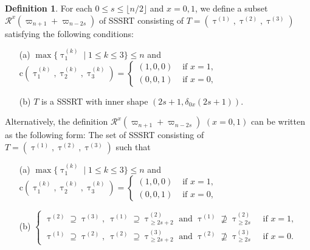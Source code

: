 \documentclass[11pt, leqno]{amsart}
\theoremstyle{plain}
\theoremstyle{definition}
\newtheorem{definition}[theorem]{Definition}
\numberwithin{equation}{section}
\newcommand{\fw}{\varpi} %
\newcommand{\ntau}[1]{\btau^{(#1)}}
\newcommand{\clr}{\mathrm{c}}
\newcommand{\btau}{\uptau}
\begin{document}
\begin{definition}
For each $0 \le s \le \lfloor n/2 \rfloor$ and $x=0,1$, we define a subset $\mathscr{R}^x(\fw_{n+1}+\fw_{n-2s})$ of SSSRT consisting of $T = (\ntau{1},\ntau{2},\ntau{3})$ satisfying the following conditions:
\begin{enumerate}
\item[{\rm (a)}] $\max\{ \ntau{k}_1 \mid 1 \le k \le 3 \} \le n$ and $\clr(\ntau{k}_1,\ntau{k}_2,\ntau{k}_3)= \begin{cases}
(1,0,0) &\text{ if } x=1, \\
(0,0,1) &\text{ if } x=0,
\end{cases}$
\item[{\rm (b)}] $T$ is a SSSRT with inner shape $(2s+1, \delta_{0x}(2s+1))$.
\end{enumerate}
\end{definition}

Alternatively, the definition $\mathscr{R}^x(\fw_{n+1}+\fw_{n-2s})$ $(x=0,1)$ can be written as the following form: The set of SSSRT consisting of $T=(\ntau{1},\ntau{2},\ntau{3})$ such that
\begin{enumerate}
\item[{\rm (a)}] $\max\{ \ntau{k}_1 \mid 1 \le k \le 3 \} \le n$ and $\clr(\ntau{k}_1,\ntau{k}_2,\ntau{k}_3)= \begin{cases}
(1,0,0) &\text{ if } x=1, \\
(0,0,1) &\text{ if } x=0,
\end{cases}$
\item[{\rm (b)}] $\begin{cases}
\ntau{2} \supseteq \ntau{3},  \ \ntau{1} \supseteq \ntau{2}_{\ge 2s+2} \text{ and } \ntau{1} \not\supseteq \ntau{2}_{\ge 2s} & \text{ if } x =1, \\
\ntau{1} \supseteq \ntau{2},  \ \ntau{2} \supseteq \ntau{3}_{\ge 2s+2} \text{ and } \ntau{2} \not\supseteq \ntau{3}_{\ge 2s} & \text{ if } x =0.
\end{cases}
$
\end{enumerate}
\end{document}
